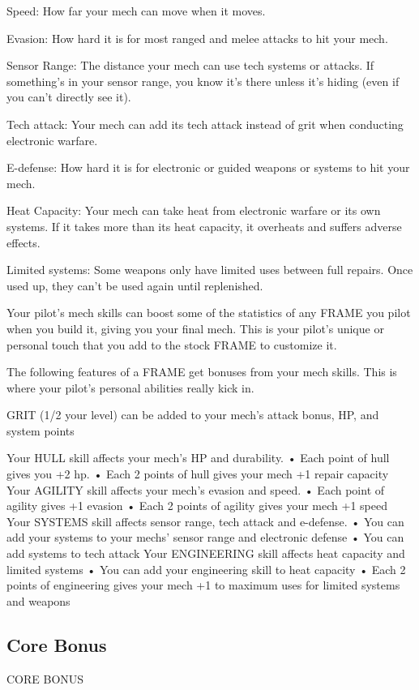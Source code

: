 Speed: How far your mech can move when it moves.

Evasion: How hard it is for most ranged and melee attacks to hit your mech.

Sensor Range: The distance your mech can use tech systems or attacks. If something’s in your
sensor range, you know it’s there unless it’s hiding (even if you can’t directly see it).

Tech attack: Your mech can add its tech attack instead of grit when conducting electronic
warfare.

E-defense: How hard it is for electronic or guided weapons or systems to hit your mech.

Heat Capacity: Your mech can take heat from electronic warfare or its own systems. If it takes
more than its heat capacity, it overheats and suffers adverse effects.

Limited systems: Some weapons only have limited uses between full repairs. Once used up,
they can’t be used again until replenished.


Your pilot’s mech skills can boost some of the statistics of any FRAME you pilot when you build
it, giving you your final mech. This is your pilot’s unique or personal touch that you add to the
stock FRAME to customize it.


The following features of a FRAME get bonuses from your mech skills. This is where your pilot’s
personal abilities really kick in.


GRIT (1/2 your level) can be added to your mech’s attack bonus, HP, and system points


Your HULL skill affects your mech’s HP and durability.
       •  Each point of hull gives you +2 hp.
       •  Each 2 points of hull gives your mech +1 repair capacity
Your AGILITY skill affects your mech’s evasion and speed.
       •  Each point of agility gives +1 evasion
       •  Each 2 points of agility gives your mech +1 speed
Your SYSTEMS skill affects sensor range, tech attack and e-defense.
       •  You can add your systems to your mechs’ sensor range and electronic defense
       •  You can add systems to tech attack
Your ENGINEERING skill affects heat capacity and limited systems
       •  You can add your engineering skill to heat capacity
       •  Each 2 points of engineering gives your mech +1 to maximum uses for limited systems
         and weapons
\subsection{Core Bonus}
                                              CORE BONUS

